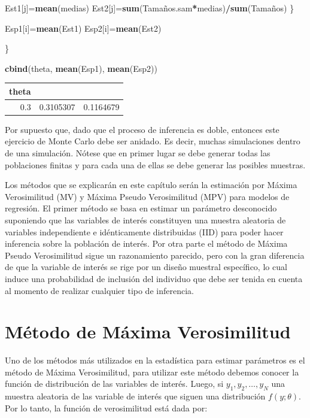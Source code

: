 \documentclass[
  12pt,
]{book}
\newenvironment{Shaded}{\begin{snugshade}}{\end{snugshade}}
\newcommand{\FunctionTok}[1]{\textcolor[rgb]{0.13,0.29,0.53}{\textbf{#1}}}
\newcommand{\NormalTok}[1]{#1}
\newcommand{\OtherTok}[1]{\textcolor[rgb]{0.56,0.35,0.01}{#1}}
\newcommand{\SpecialCharTok}[1]{\textcolor[rgb]{0.81,0.36,0.00}{\textbf{#1}}}
\begin{document}
\begin{Shaded}
\begin{Highlighting}[]
\NormalTok{Est1[j]}\OtherTok{=}\FunctionTok{mean}\NormalTok{(medias)}
\NormalTok{Est2[j]}\OtherTok{=}\FunctionTok{sum}\NormalTok{(Tamaños.sam}\SpecialCharTok{*}\NormalTok{medias)}\SpecialCharTok{/}\FunctionTok{sum}\NormalTok{(Tamaños)}
\NormalTok{\}}

\NormalTok{Esp1[i]}\OtherTok{=}\FunctionTok{mean}\NormalTok{(Est1)}
\NormalTok{Esp2[i]}\OtherTok{=}\FunctionTok{mean}\NormalTok{(Est2)}

\NormalTok{\}}

\FunctionTok{cbind}\NormalTok{(theta, }\FunctionTok{mean}\NormalTok{(Esp1), }\FunctionTok{mean}\NormalTok{(Esp2))}
\end{Highlighting}
\end{Shaded}

\begin{tabular}{r|r|r}
\hline
theta &  & \\
\hline
0.3 & 0.3105307 & 0.1164679\\
\hline
\end{tabular}

Por supuesto que, dado que el proceso de inferencia es doble, entonces este ejercicio de Monte Carlo debe ser anidado. Es decir, muchas simulaciones dentro de una simulación. Nótese que en primer lugar se debe generar todas las poblaciones finitas y para cada una de ellas se debe generar las posibles muestras.

Los métodos que se explicarán en este capítulo serán la estimación por Máxima Verosimilitud (MV) y Máxima Pseudo Verosimilitud (MPV) para modelos de regresión. El primer método se basa en estimar un parámetro desconocido suponiendo que las variables de interés constituyen una muestra aleatoria de variables independiente e idénticamente distribuidas (IID) para poder hacer inferencia sobre la población de interés. Por otra parte el método de Máxima Pseudo Verosimilitud sigue un razonamiento parecido, pero con la gran diferencia de que la variable de interés se rige por un diseño muestral específico, lo cual induce una probabilidad de inclusión del individuo que debe ser tenida en cuenta al momento de realizar cualquier tipo de inferencia.

\section{Método de Máxima Verosimilitud}\label{muxe9todo-de-muxe1xima-verosimilitud}

Uno de los métodos más utilizados en la estadística para estimar parámetros es el método de Máxima Verosimilitud, para utilizar este método debemos conocer la función de distribución de las variables de interés. Luego, si \(y_{1},y_{2},\ldots,y_{N}\) una muestra aleatoria de las variable de interés que siguen una distribución \(f(y;\theta)\). Por lo tanto, la función de verosimilitud está dada por:
\end{document}
